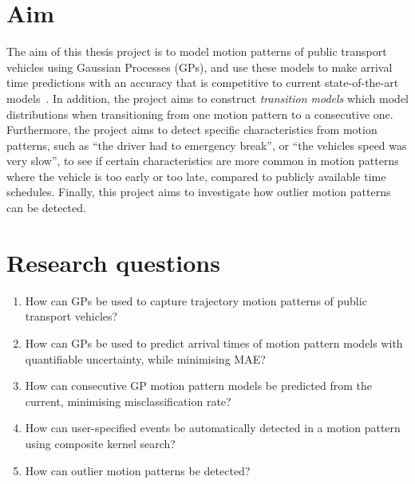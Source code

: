 
\section{Aim}\label{sec:aim}
The aim of this thesis project is to model motion patterns of public
transport vehicles using Gaussian Processes (GPs), and use these
models to make arrival time predictions with an accuracy that is
competitive to current state-of-the-art models~\cite{Sinn2012Sep,
  Gurmu2014, pang2018learning}. In addition, the project aims to
construct \textit{transition models} which model distributions when
transitioning from one motion pattern to a consecutive one. 
Furthermore, the project aims to
detect specific characteristics from motion patterns, such as ``the
driver had to emergency break'', or ``the vehicles speed was very slow'', to see if certain characteristics
are more common in motion patterns where the vehicle is too early or
too late, compared to publicly available time schedules. Finally, this
project aims to investigate how outlier motion patterns can be
detected.

\section{Research questions}\label{sec:research-questions}

\begin{enumerate}
\item How can GPs be used to capture trajectory motion
  patterns of public transport vehicles?

\item How can GPs be used to predict arrival times of motion pattern
  models with quantifiable uncertainty, while minimising MAE?

\item How can consecutive GP motion pattern models be predicted from 
  the current, minimising misclassification rate?
  
\item How can user-specified events be automatically detected in a
  motion pattern using composite kernel search?

\item How can outlier motion patterns be detected?
\end{enumerate}

